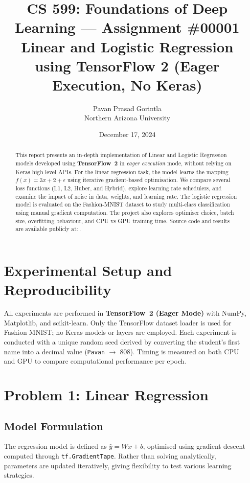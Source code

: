 \documentclass{article}
\title{CS 599: Foundations of Deep Learning --- Assignment \#00001\\
Linear and Logistic Regression using TensorFlow 2 (Eager Execution, No Keras)}
\author{Pavan Prasad Gorintla\\Northern Arizona University}
\date{December 17, 2024}
\begin{document}
\maketitle

\begin{abstract}
This report presents an in-depth implementation of Linear and Logistic Regression models developed using \textbf{TensorFlow~2} in \emph{eager execution} mode, without relying on Keras high-level APIs. For the linear regression task, the model learns the mapping $f(x) = 3x + 2 + \epsilon$ using iterative gradient-based optimisation. We compare several loss functions (L1, L2, Huber, and Hybrid), explore learning rate schedulers, and examine the impact of noise in data, weights, and learning rate. The logistic regression model is evaluated on the Fashion-MNIST dataset to study multi-class classification using manual gradient computation. The project also explores optimiser choice, batch size, overfitting behaviour, and CPU vs GPU training time. Source code and results are available publicly at:  
\textbf{}.
\end{abstract}

\section{Experimental Setup and Reproducibility}
All experiments are performed in \textbf{TensorFlow~2 (Eager Mode)} with NumPy, Matplotlib, and scikit-learn. Only the TensorFlow dataset loader is used for Fashion-MNIST; no Keras models or layers are employed. Each experiment is conducted with a unique random seed derived by converting the student's first name into a decimal value (\texttt{Pavan} $\to$ 808). Timing is measured on both CPU and GPU to compare computational performance per epoch.

\section{Problem 1: Linear Regression}
\subsection{Model Formulation}
The regression model is defined as $\hat{y} = Wx + b$, optimised using gradient descent computed through \texttt{tf.GradientTape}. Rather than solving analytically, parameters are updated iteratively, giving flexibility to test various learning strategies.
\end{document}
